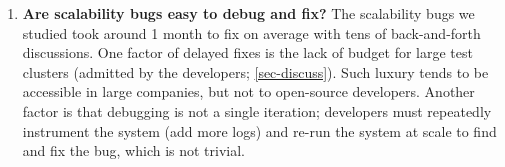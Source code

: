 \begin{enumerate}
\item {\bf Are scalability bugs easy to debug and fix?}
%
The scalability bugs we studied took around 1 month to fix on average
with tens of back-and-forth discussions.
One factor of delayed fixes is the lack of budget for large test clusters
(admitted by the developers; \sec\ref{sec-discuss}).  Such luxury tends to
be accessible in large companies, but not to open-source developers.
Another factor is that debugging is not a single iteration; developers
must repeatedly instrument the system (add more logs) and re-run the
system at scale to find and fix the bug, which is not trivial.

\end{enumerate}

